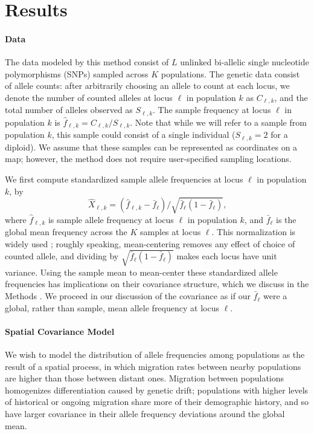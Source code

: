 \documentclass[12pt]{article}
\newcommand{\gc}[1]{{\it\color{blue}{(#1)}}}
\begin{document}
\section*{Results}

\paragraph{Data}


The data modeled by this method consist of $L$ unlinked bi-allelic single nucleotide polymorphisms (SNPs) sampled across $K$ populations.
The genetic data consist of allele counts: after arbitrarily choosing an allele to count at each locus, 
we denote the number of counted alleles at locus $\ell$ in population $k$ as $C_{\ell,k}$,
and the total number of alleles observed as $S_{\ell,k}$.
The sample frequency at locus $\ell$ in population $k$ is $\hat{f}_{\ell,k} = C_{\ell,k}/S_{\ell,k}$.  
Note that while we will refer to a sample from population $k$, this sample could consist of a single individual ($S_{\ell,k}=2$ for a diploid).
We assume that these samples can be represented as coordinates on a map; however, the method does not require user-specified sampling locations.

We first compute standardized sample allele frequencies at locus $\ell$ in population $k$, by
\begin{equation}
  \label{eq:standardized_sample_freqs}
  \hat{X}_{\ell,k} = (\hat{f}_{\ell,k}  - \bar{f}_{\ell})/\sqrt{\bar{f}_{\ell}(1-\bar{f}_{\ell})}\text{,}
\end{equation}
where $\hat{f}_{\ell,k}$ is sample allele frequency at locus $\ell$ in population $k$, and $\bar{f}_{\ell}$ is the global mean frequency across the $K$ samples at locus $\ell$.  
This normalization is widely used \citep[e.g.][]{nicholson2002,Patterson2006};
roughly speaking, mean-centering removes any effect of choice of counted allele,
and dividing by $\sqrt{\bar{f}_{\ell}(1-\bar{f}_{\ell})}$ makes each locus have unit variance.
Using the sample mean to mean-center these standardized allele frequencies has implications on their covariance structure, which we discuss in the Methods \gc{Section XXX}.  
We proceed in our discussion of the covariance as if our $\bar{f}_{\ell}$ were a global, rather than sample, mean allele frequency at locus $\ell$.

\paragraph{Spatial Covariance Model}
We wish to model the distribution of allele frequencies among populations as the result of a spatial process, in which migration rates between nearby populations are higher than those between distant ones.  
Migration between populations homogenizes differentiation caused by genetic drift; 
populations with higher levels of historical or ongoing migration share more of their demographic history,
and so have larger covariance in their allele frequency deviations around the global mean.
\end{document}
